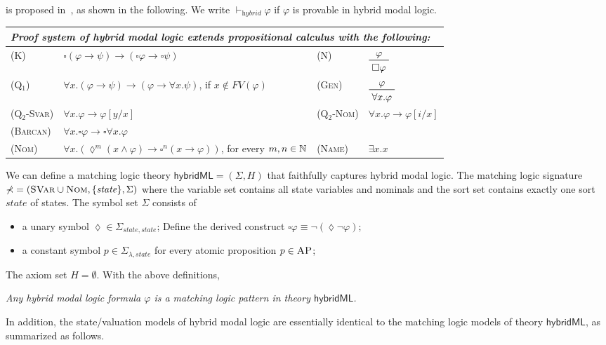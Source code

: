 \documentclass[acmsmall,review,anonymous]{acmart}
\newcommand{\imp}{\to}
\newcommand{\SVar}{\textnormal{\textsc{SVar}}}
\newcommand{\Nom}{\textnormal{\textsc{Nom}}}
\newcommand{\sig}{\mathbb{\Sigma}}
\newcommand{\FV}{\mathit{FV}}
\newcommand{\MLhybridML}{\mathsf{hybridML}}
\newcommand{\hybridModalLogic}{\textit{hybrid}}
\newcommand{\prule}[1]{\textsc{(#1)}}
\newcommand{\AP}{\textsc{AP}}
\newcommand{\always}{{\square}}
\newcommand{\eventually}{{\lozenge}}
\newcommand{\statesort}{\mathit{state}}
\begin{document}
is proposed in~\cite{}, as shown in the following.
We write $\vdash_\hybridModalLogic \varphi$ if $\varphi$ is provable in hybrid modal logic.
\begin{center}
\renewcommand{\arraystretch}{1.15}
\begin{tabular}{lm{7cm}lm{3cm}}
\multicolumn{4}{l}{\em Proof system of hybrid modal logic extends
propositional calculus with the following:}
\\\hline
\prule{K}&
$\always (\varphi \imp \psi) \imp
 (\always \varphi \imp \always \psi)$
&
\prule{N}&
$\prftree{\varphi}{\always \varphi}$
\\
\prule{Q$_1$}&
$\forall x . (\varphi \imp \psi) \imp (\varphi \imp \forall x . \psi)$,
if $x \not\in \FV(\varphi)$
&
\prule{Gen} &
$\prftree{\varphi}{\forall x . \varphi}$
\\
\prule{Q$_2$-Svar} &
$\forall x . \varphi \imp \varphi[y/x]$
&
\prule{Q$_2$-Nom} &
$\forall x . \varphi \imp \varphi[i/x]$
\\
\prule{Barcan} &
$\forall x . \always \varphi \imp \always \forall x . \varphi$
\\
\prule{Nom}&
$\forall x . (\eventually^m (x \wedge \varphi)
\imp \always^n(x \imp \varphi))$,
for every $m,n \in \mathbb{N}$
&
\prule{Name}&
$\exists x . x$
\end{tabular}
\renewcommand{\arraystretch}{1}
\end{center}

We can define a matching logic theory 
$\MLhybridML = (\sig, H)$
that faithfully captures hybrid modal logic.
The matching logic signature $\sig = (\SVar \cup \Nom , \{ \statesort  \} , \Sigma)$
where the variable set contains all state variables and nominals
and the sort set contains exactly one sort $\statesort$ of states.
The symbol set $\Sigma$ consists of
\begin{itemize}
\item a unary symbol $\eventually \in \Sigma_{\statesort , \statesort}$;
      Define the derived construct
      $\always \varphi \equiv \neg (\eventually \neg \varphi)$;
\item a constant symbol $p \in \Sigma_{\lambda,\statesort}$ 
      for every atomic proposition $p \in \AP$;
\end{itemize}
The axiom set $H = \emptyset$.
With the above definitions,
\begin{center}
\em
Any hybrid modal logic formula $\varphi$ is a matching logic pattern
in theory $\MLhybridML$.
\end{center}
In addition, the state/valuation models of hybrid modal logic
are essentially identical to the matching logic models of theory $\MLhybridML$,
as summarized as follows.
\end{document}
